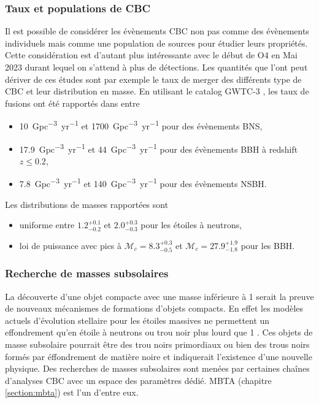 \subsubsection*{Taux et populations de CBC}
\label{sec:rateNpop}
Il est possible de considérer les évènements CBC non pas comme des évènements individuels mais comme une population de sources pour étudier leurs propriétés.
Cette considération est d'autant plus intéressante avec le début de O4 en Mai 2023 durant lequel on s'attend à plus de détections.
Les quantités que l'ont peut dériver de ces études sont par exemple le taux de merger des différents type de CBC et leur distribution en masse.
En utilisant le catalog GWTC-3 \cite{gwtc3}, les taux de fusions ont été rapportés dans \cite{rate_and_pop} entre
\begin{itemize}
\item \SI{10}{Gpc^{-3}.yr^{-1}} et \SI{1700}{Gpc^{-3}.yr^{-1}} pour des évènements BNS,
\item \SI{17.9}{Gpc^{-3}.yr^{-1}} et \SI{44}{Gpc^{-3}.yr^{-1}} pour des évènements BBH à redshift $z \leq 0.2$,
\item \SI{7.8}{Gpc^{-3}.yr^{-1}} et \SI{140}{Gpc^{-3}.yr^{-1}} pour des évènements NSBH.
\end{itemize}
%
Les distributions de masses rapportées sont
\begin{itemize}
\item uniforme entre  $1.2^{+0.1}_{-0.2}$ \si{\msun} et $2.0^{+0.3}_{-0.3}$ \si{\msun} pour les étoiles à neutrons,
\item loi de puissance avec pics à $\mathcal{M}_{c} = 8.3^{+0.3}_{-0.5}$ \si{\msun} et $\mathcal{M}_{c} = 27.9^{+1.9}_{-1.8}$ \si{\msun} pour les BBH.
\end{itemize}

\subsubsection*{Recherche de masses subsolaires}
\label{sec:ssm}
La découverte d'une objet compacte avec une masse inférieure à \SI{1}{\msun} serait la preuve de nouveaux mécanismes de formations d'objets compacts.
En effet les modèles actuels d'évolution stellaire pour les étoiles massives ne permettent un effondrement qu'en étoile à neutrons ou trou noir plus lourd que \SI{1}{\msun} \cite{ssm_O3a,ssm_O3b}.
Ces objets de masse subsolaire pourrait être des trou noirs primordiaux \cite{primordial_bh} ou bien des trous noirs formés par éffondrement de matière noire \cite{dm1,dm2,dm3} et indiquerait l'existence d'une nouvelle physique.
Des recherches de masses subsolaires sont menées par certaines chaînes d'analyses CBC avec un espace des paramètres dédié.
MBTA (chapitre \ref{section:mbta}) est l'un d'entre eux.

